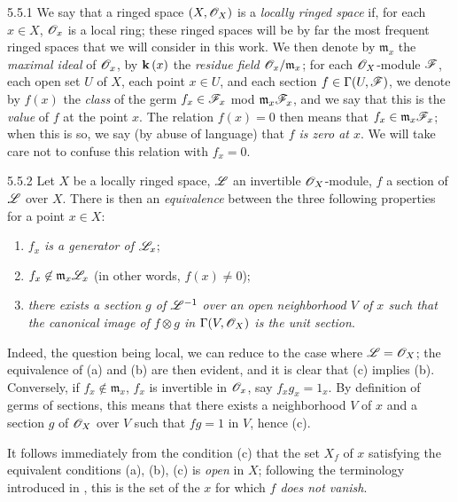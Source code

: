 \begin{env}{5.5.1}
\label{env-0.5.5.1}
We say that a ringed space $(X,\mathscr{O}_X)$ is a \emph{locally ringed space} if, for
each $x\in X$, $\mathscr{O}_x$ is a local ring; these ringed spaces will be by far the
most frequent ringed spaces that we will consider in this work. We then denote
by $\mathfrak{m}_x$ the \emph{maximal ideal} of $\mathscr{O}_x$, by $\mathbf{k}\,(x)$ the
\emph{residue field $\mathscr{O}_x/\mathfrak{m}_x$}; for each $\mathscr{O}_X$-module $\mathscr{F}$,
each open set $U$ of $X$, each point $x\in U$, and each section
$f\in\Gamma(U,\mathscr{F})$, we denote by $f(x)$ the \emph{class} of the germ
$f_x\in\mathscr{F}_x$ mod $\mathfrak{m}_x\mathscr{F}_x$, and we say that this is the
\emph{value} of $f$ at the point $x$. The relation $f(x)=0$ then means that
$f_x\in\mathfrak{m}_x\mathscr{F}_x$; when this is so, we say (by abuse of language)
that \emph{$f$ is zero at $x$}. We will take care not to confuse this relation
with $f_x=0$.
\end{env}

\begin{env}{5.5.2}
\label{env-0.5.5.2}
Let $X$ be a locally ringed space, $\mathscr{L}$ an invertible $\mathscr{O}_X$-module, $f$ a
section of $\mathscr{L}$ over $X$. There is then an \emph{equivalence} between the
three following properties for a point $x\in X$:
\begin{enumerate}[label=(\alph*)]
  \item \emph{$f_x$ is a generator of $\mathscr{L}_x$};
  \item \emph{$f_x\not\in\mathfrak{m}_x\mathscr{L}_x$}
        (in other words, $f(x)\neq 0$);
  \item \emph{there exists a section $g$ of $\mathscr{L}^{-1}$ over an open
        neighborhood $V$ of $x$ such that the canonical image of $f\otimes g$ in
        $\Gamma(V,\mathscr{O}_X)$  is the unit section}.
\end{enumerate}

Indeed, the question being local, we can reduce to the case where
$\mathscr{L}=\mathscr{O}_X$; the equivalence of (a) and (b) are then evident, and it is clear
that (c) implies (b). Conversely, if $f_x\not\in\mathfrak{m}_x$, $f_x$ is
invertible in $\mathscr{O}_x$, say $f_x g_x=1_x$. By definition of germs of sections,
this means that there exists a neighborhood $V$ of $x$ and a section $g$ of
$\mathscr{O}_X$ over $V$ such that $fg=1$ in $V$, hence (c).

It follows immediately from the condition (c) that the set $X_f$ of $x$ satisfying the
equivalent conditions (a), (b), (c) is \emph{open} in $X$; following the terminology
introduced in , this is the set of the $x$ for which \emph{$f$ does not
vanish}.
\end{env}

